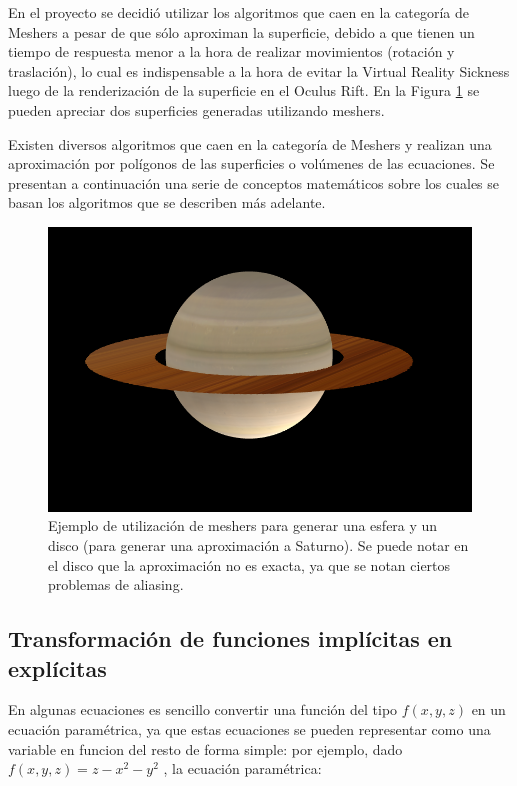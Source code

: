 \documentclass[12pt]{article}
\begin{document}
En el proyecto se decidió utilizar los algoritmos que caen en la categoría de Meshers\cite{mykola1}\cite{mykola2} a pesar de que sólo aproximan la superficie, debido a que tienen un tiempo de respuesta menor a la hora de realizar movimientos (rotación y traslación), lo cual es indispensable a la hora de evitar la Virtual Reality Sickness luego de la renderización de la superficie en el Oculus Rift. En la Figura \ref{saturno} se pueden apreciar dos superficies generadas utilizando meshers.

Existen diversos algoritmos que caen en la categoría de Meshers y realizan una aproximación por polígonos de las superficies o volúmenes de las ecuaciones. Se presentan a continuación una serie de conceptos matemáticos sobre los cuales se basan los algoritmos que se describen más adelante.
\begin{figure}[h]
\includegraphics[width=\textwidth]{saturno.png}
\caption{Ejemplo de utilización de meshers para generar una esfera y un disco (para generar una aproximación a Saturno). Se puede notar en el disco que la aproximación no es exacta, ya que se notan ciertos problemas de aliasing.}
\label{saturno}
\end{figure}
\clearpage

\subsection{Transformación de funciones implícitas en explícitas}
En algunas ecuaciones es sencillo convertir una función del tipo $f(x,y,z)$ en un ecuación paramétrica, ya que estas ecuaciones se pueden representar como una variable en funcion del resto de forma simple: por ejemplo, dado $f(x,y,z)  = z- x^2 - y^2$ , la ecuación paramétrica: 
\end{document}
